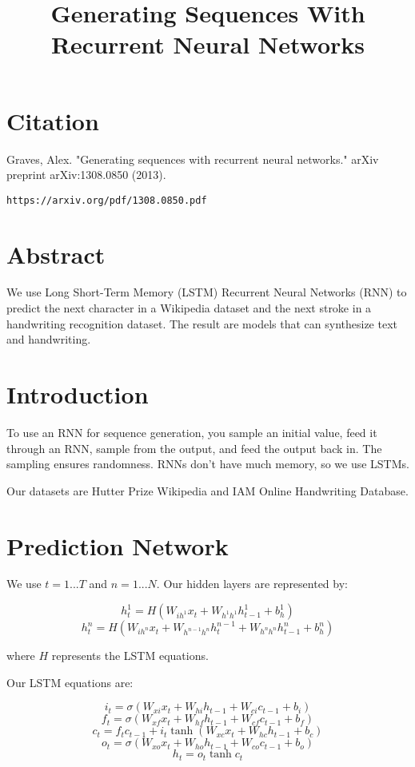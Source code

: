 \documentclass[a4paper]{article}
\title{Generating Sequences With Recurrent Neural Networks}
\date{}
\begin{document}
\maketitle

\section{Citation}
Graves, Alex. "Generating sequences with recurrent neural networks." arXiv preprint arXiv:1308.0850 (2013).

\begin{verbatim}
https://arxiv.org/pdf/1308.0850.pdf
\end{verbatim}

\section{Abstract}
We use Long Short-Term Memory (LSTM) Recurrent Neural Networks (RNN) to
predict the next character in a Wikipedia dataset and the next stroke in a
handwriting recognition dataset. The result are models that can synthesize
text and handwriting.

\section{Introduction}
To use an RNN for sequence generation, you sample an initial value, feed it
through an RNN, sample from the output, and feed the output back in. The
sampling ensures randomness. RNNs don't have much memory, so we use LSTMs.

Our datasets are Hutter Prize Wikipedia and IAM Online Handwriting Database.

\section{Prediction Network}
We use $t = 1...T$ and $n = 1...N$. Our hidden layers are represented by:

$$
h_t^1 = H(W_{ih^1} x_t + W_{h^1 h^1} h_{t-1}^1 + b_h^1)
$$
$$
h_t^n = H(W_{ih^n} x_t + W_{h^{n-1} h^{n}} h_t^{n-1} + W_{h^n h^n} h^{n}_{t-1}
+ b_h^n)
$$

where $H$ represents the LSTM equations.

Our LSTM equations are:

$$
i_t = \sigma(W_{xi} x_t + W_{hi} h_{t-1} + W_{ci} c_{t-1} + b_i)
$$
$$
f_t = \sigma(W_{xf} x_t + W_{hf} h_{t-1} + W_{cf} c_{t-1} + b_f)
$$
$$
c_t = f_t c_{t-1} + i_t \tanh{(W_{xc} x_t + W_{hc} h_{t-1} + b_c)}
$$
$$
o_t = \sigma(W_{xo} x_t + W_{ho} h_{t-1} + W_{co} c_{t-1} + b_o)
$$
$$
h_t = o_t \tanh{c_t}
$$
\end{document}
